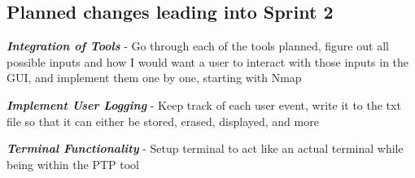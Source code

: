 \documentclass{article}
\begin{document}
\subsection{Planned changes leading into Sprint 2}
\begin{center}
    \textbf{\textit{Integration of Tools}} - Go through each of the tools planned, figure out all possible inputs and how I would want a user to interact with those inputs in the GUI, and implement them one by one, starting with Nmap 
\end{center}
\begin{center}
    \textbf{\textit{Implement User Logging}} - Keep track of each user event, write it to the txt file so that it can either be stored, erased, displayed, and more
\end{center}
\begin{center}
    \textbf{\textit{Terminal Functionality}} - Setup terminal to act like an actual terminal while being within the PTP tool
\end{center}
\end{document}
